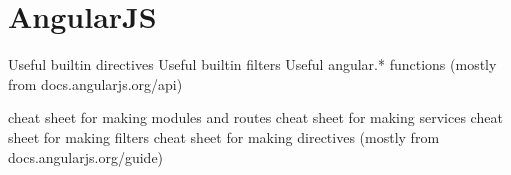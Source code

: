 \documentclass[12pt]{article}
\begin{document}
\section{AngularJS}

Useful builtin directives
Useful builtin filters
Useful angular.* functions
(mostly from docs.angularjs.org/api)

cheat sheet for making modules and routes
cheat sheet for making services
cheat sheet for making filters
cheat sheet for making directives
(mostly from docs.angularjs.org/guide)
\end{document}
